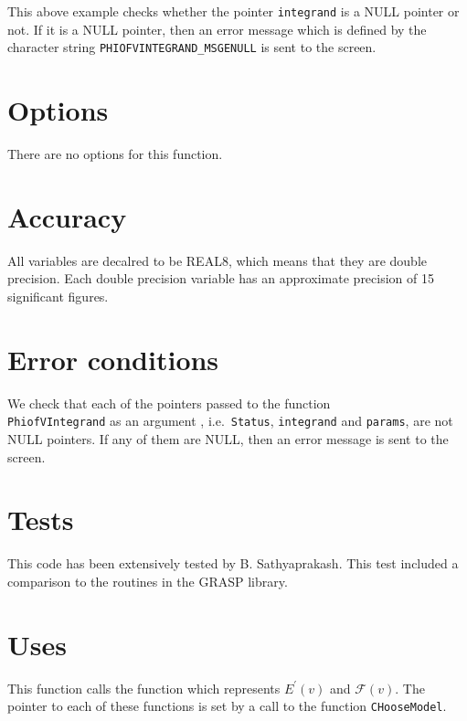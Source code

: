 \documentclass[12pt]{article}
\begin{document}
\vspace{5mm}

This above example checks whether the pointer \texttt{integrand} is a NULL pointer or not. If it is a NULL pointer, then an error message which is defined by the character string \texttt{PHIOFVINTEGRAND\_MSGENULL} is sent to the screen.


\section{Options}

There are no options for this function.


\section{Accuracy}

All variables are decalred to be REAL8, which means that they are double precision.
Each double precision variable has an approximate precision of 15 significant figures.


\section{Error conditions}

We check that each of the pointers passed to the function \\ \texttt{PhiofVIntegrand} as an argument , i.e.\ \texttt{Status}, \texttt{integrand} and \texttt{params}, are not NULL pointers. If any of them are NULL, then an error message is sent to the screen.


\section{Tests}

This code has been extensively tested by B. Sathyaprakash. This test included a comparison to the routines in the GRASP library.

\section{Uses}

This function calls the function which represents $E^{\prime}(v)$ and $\mathcal{F}(v)$. The pointer to each of these functions is set by a call to the function \texttt{CHooseModel}.
\end{document}
